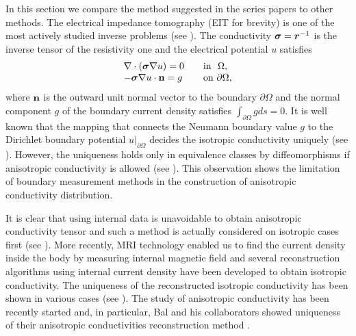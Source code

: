 \documentclass[11pt]{amsart}
\theoremstyle{plain}
\theoremstyle{remark}
\numberwithin{equation}{section}
\numberwithin{Thm}{section}
\def\r{{\bf r}}
\def\n{{\bf n}}
\def\Sigma{\mbox{\boldmath$\sigma$}}
\def\r{\mbox{\boldmath$r$}}
\begin{document}
In this section we compare the method suggested in the series papers to other methods. The electrical impedance tomography (EIT for brevity) is one of the most actively studied inverse problems (see \cite{ammari_mathematical_2009, ammari_reconstruction_2004,0266-5611-25-12-123011}). The conductivity $\Sigma=\r^{-1}$ is the inverse tensor of the resistivity one and the electrical potential $u$ satisfies
\begin{equation}\label{eqn:div}
\begin{array}{ll}
\nabla\cdot(\Sigma\nabla u)=0  &\quad \mbox{in~~} \Omega,\\
-\Sigma\nabla u\cdot\n=g&\quad \mbox{on~} \partial\Omega,\\
\end{array}
\end{equation}
where $\n$ is the outward unit normal vector to the boundary $\partial\Omega$ and the normal component $g$ of the boundary current density satisfies $\int_{\partial\Omega}gds=0$. It is well known that the mapping that connects the Neumann boundary value $g$ to the Dirichlet boundary potential $u|_{\partial\Omega}$ decides the isotropic conductivity uniquely (see \cite{nachman_global_1996,sylvester_global_1987}). However, the uniqueness holds only in equivalence classes by diffeomorphisms if anisotropic conductivity is allowed (see \cite{MR1955896}). This observation shows the limitation of boundary measurement methods in the construction of anisotropic conductivity distribution.

It is clear that using internal data is unavoidable to obtain anisotropic conductivity tensor and such a method is actually considered on isotropic cases first (see \cite{alessandrini_identification_1986, richter_inverse_1981, richter_numerical_1981}). More recently, MRI technology enabled us to find the current density inside the body by measuring internal magnetic field and several reconstruction algorithms using internal current density have been developed to obtain isotropic conductivity. The uniqueness of the reconstructed isotropic conductivity has been shown in various cases (see \cite{ider_uniqueness_2003,kim_uniqueness_2003, kwon_equipotential_2002,nachman_conductivity_2007,nachman_recovering_2009, seo_magnetic_2011}). The study of anisotropic conductivity has been recently started and, in particular, Bal and his collaborators showed uniqueness of their anisotropic conductivities reconstruction method \cite{bal_inverse_2011, doi:10.1137/140961754, bal_inverse_2014, monard_inverse_2012-1,monard_inverse_2012}.  
\end{document}
